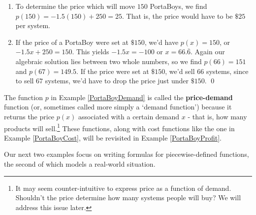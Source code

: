 \begin{ex}
\begin{enumerate}
\item  To determine the price which will move $150$ PortaBoys, we find $p(150) = -1.5(150) + 250 = 25$.  That is, the price would have to be $\$25$ per system.

\item  If the price of a PortaBoy were set at $\$150$, we'd have $p(x) = 150$, or $-1.5x + 250 = 150$.  This yields $-1.5x = -100$ or $x = 66.\overline{6}$. Again our algebraic solution lies between two whole numbers, so we find $p(66) = 151$ and $p(67) = 149.5$.  If the price were set at $\$ 150$, we'd sell $66$ systems, since to sell $67$ systems, we'd have to drop the price just under $\$150$.  \qed

\end{enumerate}


\end{ex}


The function $p$ in Example \ref{PortaBoyDemand} is called the \textbf{price-demand} function (or, sometimes called more simply a `demand function') because it returns the price $p(x)$ associated with a certain demand $x$ - that is, how many products will sell.\footnote{It may seem counter-intuitive to express price as a function of demand.  Shouldn't the price determine how many systems people will buy?  We will address this issue later.}  These functions, along with cost functions like the one in Example \ref{PortaBoyCost}, will be revisited in Example \ref{PortaBoyProfit}.

\medskip

Our next two examples focus on writing formulas for piecewise-defined functions, the second of which models a real-world situation.


